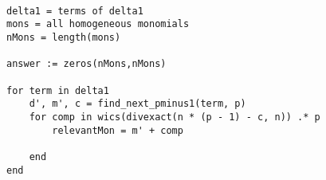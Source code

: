 \begin{alg}
\begin{lstlisting}

delta1 = terms of delta1
mons = all homogeneous monomials
nMons = length(mons)

answer := zeros(nMons,nMons)

for term in delta1
    d', m', c = find_next_pminus1(term, p)
    for comp in wics(divexact(n * (p - 1) - c, n)) .* p
        relevantMon = m' + comp
        
    end
end
\end{lstlisting}
\end{alg}







